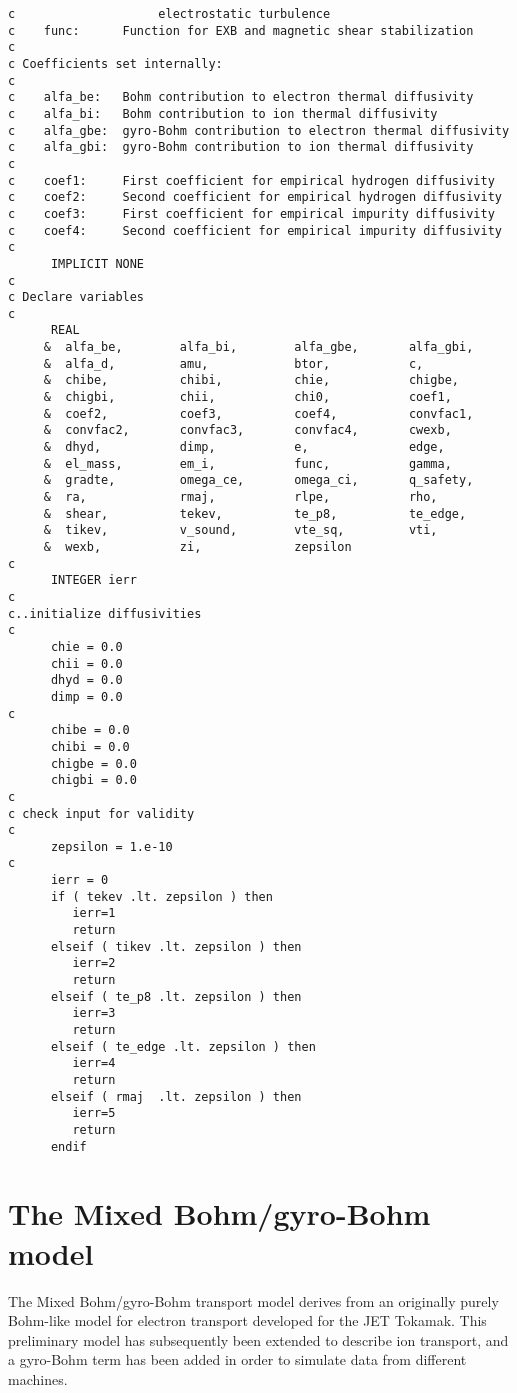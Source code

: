 \documentclass{article}    %
\begin{document}
\begin{verbatim}
c                    electrostatic turbulence 	
c    func:      Function for EXB and magnetic shear stabilization
c
c Coefficients set internally:
c
c    alfa_be:   Bohm contribution to electron thermal diffusivity
c    alfa_bi:   Bohm contribution to ion thermal diffusivity
c    alfa_gbe:  gyro-Bohm contribution to electron thermal diffusivity
c    alfa_gbi:  gyro-Bohm contribution to ion thermal diffusivity
c
c    coef1:     First coefficient for empirical hydrogen diffusivity
c    coef2:     Second coefficient for empirical hydrogen diffusivity
c    coef3:     First coefficient for empirical impurity diffusivity
c    coef4:     Second coefficient for empirical impurity diffusivity
c
      IMPLICIT NONE
c
c Declare variables
c
      REAL
     &  alfa_be,        alfa_bi,        alfa_gbe,       alfa_gbi,
     &  alfa_d,         amu,            btor,           c,		
     &  chibe,          chibi,          chie,           chigbe,		
     &  chigbi,         chii,           chi0,           coef1,		
     &  coef2,          coef3,          coef4,          convfac1,	
     &  convfac2,       convfac3,       convfac4,       cwexb,		
     &  dhyd,           dimp,           e,              edge,		
     &  el_mass,        em_i,           func,           gamma,		
     &  gradte,         omega_ce,       omega_ci,       q_safety,	
     &  ra,             rmaj,           rlpe,           rho,		
     &  shear,          tekev,          te_p8,          te_edge,	
     &  tikev,          v_sound,        vte_sq,         vti,		
     &  wexb,           zi,             zepsilon
c
      INTEGER ierr
c
c..initialize diffusivities
c
      chie = 0.0
      chii = 0.0
      dhyd = 0.0
      dimp = 0.0
c
      chibe = 0.0
      chibi = 0.0
      chigbe = 0.0
      chigbi = 0.0
c
c check input for validity
c
      zepsilon = 1.e-10
c
      ierr = 0
      if ( tekev .lt. zepsilon ) then
         ierr=1
         return
      elseif ( tikev .lt. zepsilon ) then
         ierr=2
         return
      elseif ( te_p8 .lt. zepsilon ) then
         ierr=3
         return
      elseif ( te_edge .lt. zepsilon ) then
         ierr=4
         return
      elseif ( rmaj  .lt. zepsilon ) then
         ierr=5
         return
      endif
\end{verbatim}

\section{The Mixed Bohm/gyro-Bohm model}

The Mixed Bohm/gyro-Bohm transport model derives from an
originally purely Bohm-like model for electron transport
developed for the JET Tokamak\cite{tar94}. This preliminary model has 
subsequently been extended to describe ion transport\cite{erb95},
and a gyro-Bohm term has been added in order to simulate data from
different machines\cite{erb98}.  
\end{document}
